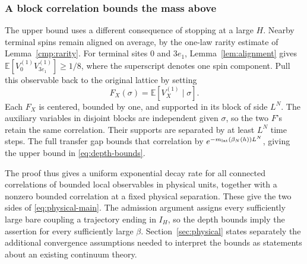 \subsubsection{A block correlation bounds the mass above}

The upper bound uses a different consequence of stopping at a large
$H$. Nearby terminal spins remain aligned on average, by the one-law
rarity estimate of Lemma~\ref{cmp:rarity}. For terminal
sites $0$ and $3e_1$, Lemma~\ref{lem:alignment} gives
$\mathbb E[V_0^{(1)}V_{3e_1}^{(1)}]\ge1/8$, where the superscript
denotes one spin component. Pull this observable back to the original
lattice by setting
\[
 F_X(\sigma)=\mathbb E[V_X^{(1)}\mid\sigma].
\]
Each $F_X$ is centered, bounded by one, and supported in its block of
side $L^N$. The auxiliary variables in disjoint blocks are independent
given $\sigma$, so the two $F$'s retain the same correlation. Their
supports are separated by at least $L^N$ time steps. The full transfer
gap bounds that correlation by $e^{-m_{\mathrm{lat}}(\beta_N(h))L^N}$, giving
the upper bound in \eqref{eq:depth-bounds}.

The proof thus gives a uniform exponential decay rate for all connected
correlations of bounded local observables in physical units, together
with a nonzero bounded correlation at a fixed physical separation.
These give the two sides of \eqref{eq:physical-main}. The admission
argument assigns every sufficiently large bare coupling a trajectory
ending in $I_H$, so the depth bounds imply the assertion for every
sufficiently large $\beta$. Section~\ref{sec:physical} states separately
the additional convergence assumptions needed to interpret the bounds
as statements about an existing continuum theory.

